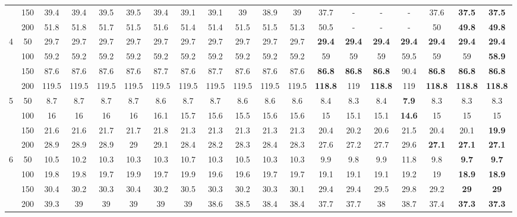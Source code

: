 \begin{table}[htbp]
\begin{adjustbox}{angle=90}
{\begin{tabular}{|c|c|c|c|c|c|c|c|c|c|c|c|c|c|c|c|c|c|c|}
     & 150 & 39.4 & 39.4 & 39.5 & 39.5 & 39.4 & 39.1 & 39.1 & 39 & 38.9 & 39 & 37.7 & - & - & - & 37.6 & \textbf{37.5} & \textbf{37.5} \\ 
     & 200 & 51.8 & 51.8 & 51.7 & 51.5 & 51.6 & 51.4 & 51.4 & 51.5 & 51.5 & 51.3 & 50.5 & - & - & - & 50 & \textbf{49.8} & \textbf{49.8} \\ \hline
    4 & 50 & 29.7 & 29.7 & 29.7 & 29.7 & 29.7 & 29.7 & 29.7 & 29.7 & 29.7 & 29.7 & \textbf{29.4} & \textbf{29.4} & \textbf{29.4} & \textbf{29.4} & \textbf{29.4} & \textbf{29.4} & \textbf{29.4} \\ 
     & 100 & 59.2 & 59.2 & 59.2 & 59.2 & 59.2 & 59.2 & 59.2 & 59.2 & 59.2 & 59.2 & 59 & 59 & 59 & 59.5 & 59 & 59 & \textbf{58.9} \\ 
     & 150 & 87.6 & 87.6 & 87.6 & 87.6 & 87.7 & 87.6 & 87.7 & 87.6 & 87.6 & 87.6 & \textbf{86.8} & \textbf{86.8} & \textbf{86.8} & 90.4 & \textbf{86.8} & \textbf{86.8} & \textbf{86.8} \\ 
     & 200 & 119.5 & 119.5 & 119.5 & 119.5 & 119.5 & 119.5 & 119.5 & 119.5 & 119.5 & 119.5 & \textbf{118.8} & 119 & \textbf{118.8} & 119 & \textbf{118.8} & \textbf{118.8} & \textbf{118.8} \\ \hline
    5 & 50 & 8.7 & 8.7 & 8.7 & 8.7 & 8.6 & 8.7 & 8.7 & 8.6 & 8.6 & 8.6 & 8.4 & 8.3 & 8.4 & \textbf{7.9} & 8.3 & 8.3 & 8.3 \\ 
     & 100 & 16 & 16 & 16 & 16 & 16.1 & 15.7 & 15.6 & 15.5 & 15.6 & 15.6 & 15 & 15.1 & 15.1 & \textbf{14.6} & 15 & 15 & 15 \\ 
     & 150 & 21.6 & 21.6 & 21.7 & 21.7 & 21.8 & 21.3 & 21.3 & 21.3 & 21.3 & 21.3 & 20.4 & 20.2 & 20.6 & 21.5 & 20.4 & 20.1 & \textbf{19.9} \\ 
     & 200 & 28.9 & 28.9 & 28.9 & 29 & 29.1 & 28.4 & 28.2 & 28.3 & 28.4 & 28.3 & 27.6 & 27.2 & 27.7 & 29.6 & \textbf{27.1} & \textbf{27.1} & \textbf{27.1} \\ \hline
    6 & 50 & 10.5 & 10.2 & 10.3 & 10.3 & 10.3 & 10.7 & 10.3 & 10.5 & 10.3 & 10.3 & 9.9 & 9.8 & 9.9 & 11.8 & 9.8 & \textbf{9.7} & \textbf{9.7} \\ 
     & 100 & 19.8 & 19.8 & 19.7 & 19.9 & 19.7 & 19.9 & 19.6 & 19.6 & 19.7 & 19.7 & 19.1 & 19.1 & 19.1 & 19.2 & 19 & \textbf{18.9} & \textbf{18.9} \\ 
     & 150 & 30.4 & 30.2 & 30.3 & 30.4 & 30.2 & 30.5 & 30.3 & 30.2 & 30.3 & 30.1 & 29.4 & 29.4 & 29.5 & 29.8 & 29.2 & \textbf{29} & \textbf{29} \\ 
     & 200 & 39.3 & 39 & 39 & 39 & 39 & 39 & 38.6 & 38.5 & 38.4 & 38.4 & 37.7 & 37.7 & 38 & 38.7 & 37.4 & \textbf{37.3} & \textbf{37.3} \\ \hline

\end{tabular}}
\end{adjustbox}
\end{table}
